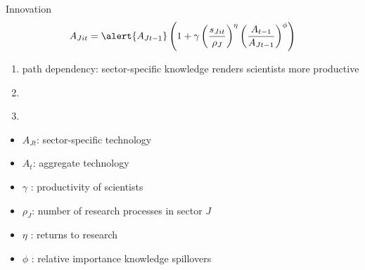 \documentclass[11pt,aspectratio=169]{beamer}
\begin{document}
\begin{frame}{Innovation}
	\pause
	\vspace{-10mm}
	\vspace{4mm}
	\large
	\begin{align*}
		A_{Jit}=\alert{A_{Jt-1}}\left(1+\gamma\left(\frac{s_{Jit}}{\rho_J}\right)^\eta\left(\frac{A_{t-1}}{A_{Jt-1}}\right)^\phi\right)
	\end{align*}
	\normalsize
	\begin{enumerate}
		\item \alert{path dependency: sector-specific knowledge renders scientists more productive} %
		\item[] \  %
		\item[] \ %
	\end{enumerate}
	\small
	\vspace{4mm}
	\hspace{-2mm}
	\begin{minipage}[t!]{0.43\textwidth}
		\vspace{0mm}
		\begin{itemize}
			\item[] $A_{Jt}$: sector-specific technology
			\vspace{-2mm}		
			\item[] $A_t$: aggregate technology
			\vspace{-2mm}
			\item[] $\gamma$ : productivity of scientists
		\end{itemize}
	\end{minipage}
	\vspace{-5mm}
	\begin{minipage}[t!]{0.55\textwidth}
		\vspace{0mm}
		\begin{itemize}	
			\item[] $\rho_J$: number of research processes in sector $J$
			\vspace{-2mm}			
			\item[] $\eta$ : returns to research
			\vspace{-2mm}			
			\item[] $\phi$ : relative importance knowledge spillovers
		\end{itemize}
	\end{minipage}
\end{frame}
\end{document}
